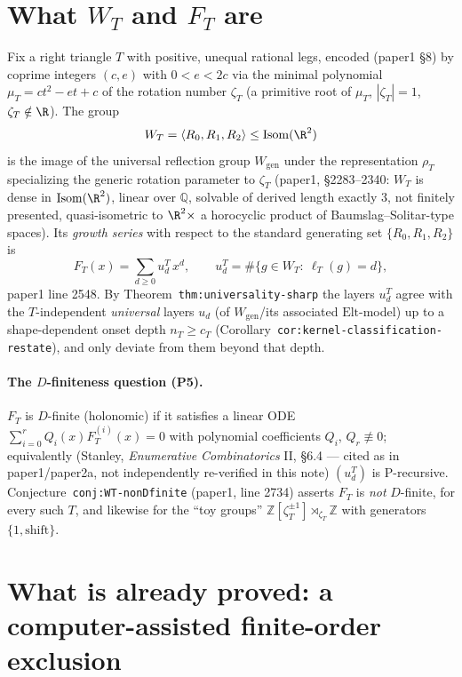 \documentclass[11pt]{article}
\theoremstyle{remark}
\newcommand{\Q}{\mathbb Q}
\newcommand{\Z}{\mathbb Z}
\begin{document}
\section{What $W_T$ and $F_T$ are}\label{sec:def}

Fix a right triangle $T$ with positive, unequal rational legs, encoded (paper1 \S8) by coprime
integers $(c,e)$ with $0<e<2c$ via the minimal polynomial $\mu_T=ct^2-et+c$ of the rotation number
$\zeta_T$ (a primitive root of $\mu_T$, $|\zeta_T|=1$, $\zeta_T\notin\R$). The group
\[
  W_T=\langle R_0,R_1,R_2\rangle\le\mathrm{Isom}(\R^2)
\]
is the image of the universal reflection group $W_{\mathrm{gen}}$ under the representation
$\rho_T$ specializing the generic rotation parameter to $\zeta_T$ (paper1, \S2283--2340: $W_T$ is
dense in $\mathrm{Isom}(\R^2)$, linear over $\Q$, solvable of derived length exactly $3$, not finitely
presented, quasi-isometric to $\R^2\times$ a horocyclic product of Baumslag--Solitar-type spaces). Its
\emph{growth series} with respect to the standard generating set $\{R_0,R_1,R_2\}$ is
\[
  F_T(x)=\sum_{d\ge0}u_d^T\,x^d,\qquad u_d^T=\#\{g\in W_T:\ \ell_T(g)=d\},
\]
paper1 line 2548. By Theorem~\texttt{thm:universality-sharp} the layers $u_d^T$ agree with the
$T$-independent \emph{universal} layers $u_d$ (of $W_{\mathrm{gen}}$/its associated
$\mathrm{Elt}$-model) up to a shape-dependent onset depth $n_T\ge c_T$
(Corollary~\texttt{cor:kernel-classification-restate}), and only deviate from them beyond that depth.

\paragraph{The $D$-finiteness question (P5).} $F_T$ is $D$-finite (holonomic) if it satisfies a linear
ODE $\sum_{i=0}^r Q_i(x)F_T^{(i)}(x)=0$ with polynomial coefficients $Q_i$, $Q_r\not\equiv0$; equivalently
(Stanley, \emph{Enumerative Combinatorics} II, \S6.4 — cited as in paper1/paper2a, not independently
re-verified in this note) $(u_d^T)$ is P-recursive. Conjecture~\texttt{conj:WT-nonDfinite} (paper1, line
2734) asserts $F_T$ is \emph{not} $D$-finite, for every such $T$, and likewise for the ``toy groups''
$\Z[\zeta_T^{\pm1}]\rtimes_{\zeta_T}\Z$ with generators $\{1,\mathrm{shift}\}$.

\section{What is already proved: a computer-assisted finite-order exclusion}\label{sec:proved}
\end{document}
